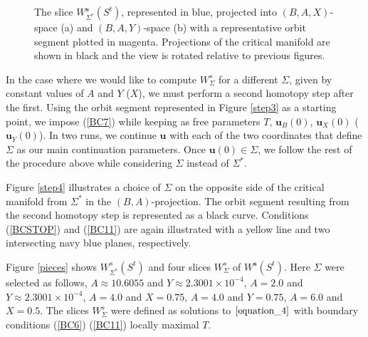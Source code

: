 \documentclass{ws-ijbc}
\begin{document}
\begin{figure}
\centering
{}
\caption{The slice $W^{\mathbf{s}}_{\Sigma^*}(S^t)$, represented in blue, projected into $(B,A,X)$-space (a) and $(B,A,Y)$-space (b) with a representative orbit segment plotted in magenta.  Projections of the critical manifold are shown in black and the view is rotated relative to previous figures.}
\label{piece}
\end{figure}
    
In the case where we would like to compute $W^{s}_{\Sigma}$ for a different $\Sigma$, given by constant values of $A$ and $Y$ ($X$), we must perform a second homotopy step after the first.  Using the orbit segment represented in Figure \ref{step3} as a starting point, we impose (\ref{BC7}) while keeping as free parameters $T$, $\mathbf{u}_B(0)$, $\mathbf{u}_X(0)$ ($\mathbf{u}_Y(0)$).  In two runs, we continue $\mathbf{u}$ with each of the two coordinates that define $\Sigma$ as our main continuation parameters. Once $\mathbf{u}(0) \in \Sigma$, we follow the rest of the procedure above while considering $\Sigma$ instead of $\Sigma^*$.
    
Figure \ref{step4} illustrates a choice of $\Sigma$ on the opposite side of the critical manifold from $\Sigma^*$ in the $(B,A)$-projection.  The orbit segment resulting from the second homotopy step is represented as a black curve.  Conditions (\ref{BCSTOP}) and (\ref{BC11}) are again illustrated with a yellow line and two intersecting navy blue planes, respectively.
    
Figure \ref{pieces} shows $W^s_{\Sigma^*}(S^t)$ and four slices $W^{s}_{\Sigma}$ of $W^{\mathbf{s}}(S^t)$.  Here $\Sigma$ were selected as follows, $A\approx10.6055$ and $Y\approx2.3001 \times 10^{-4}$, $A=2.0$ and $Y\approx2.3001 \times 10^{-4}$, $A=4.0$ and $X=0.75$, $A=4.0$ and $Y=0.75$, $A=6.0$ and $X=0.5$. The slices $W^{s}_{\Sigma}$ were defined as solutions to $\ref{equation_4}$ with boundary conditions (\ref{BC6}) (\ref{BC11}) locally maximal $T$.  
\end{document}
